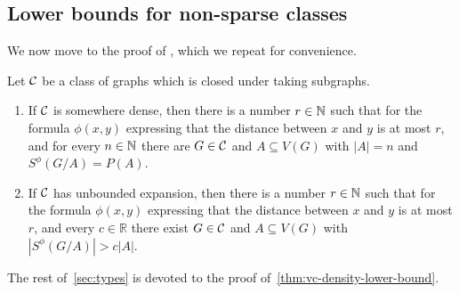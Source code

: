 \subsection{Lower bounds for non-sparse classes}
We now move to the proof of ,
which we repeat for convenience.
\setcounter{theorem}{2}
\begin{theorem}
Let $\mathcal{C}$ be a class of graphs which 
is closed under taking subgraphs. 
\begin{enumerate}[(1)]
\item If $\mathcal{C}$ is somewhere dense, then there is a number $r\in\mathbb{N}$ such that for the formula $\phi(x,y)$ expressing that the distance between $x$ and $y$ is at most $r$, and for every $n\in \mathbb{N}$ there are $G\in\mathcal{C}$ and $A\subseteq V(G)$ 
with $|A|=n$ and $S^\phi(G/A)=P(A)$.
\item If $\mathcal{C}$ has unbounded expansion, then there is a number $r\in\mathbb{N}$ such that for the formula $\phi(x,y)$ expressing that the distance between $x$ and $y$ is at most $r$, and every $c\in \mathbb{R}$ there exist $G\in\mathcal{C}$ and $A\subseteq V(G)$ with $|S^\phi(G/A)|>c|A|$. 
\end{enumerate}
\end{theorem}
The rest of~\cref{sec:types} is devoted to the proof of~\cref{thm:vc-density-lower-bound}.
